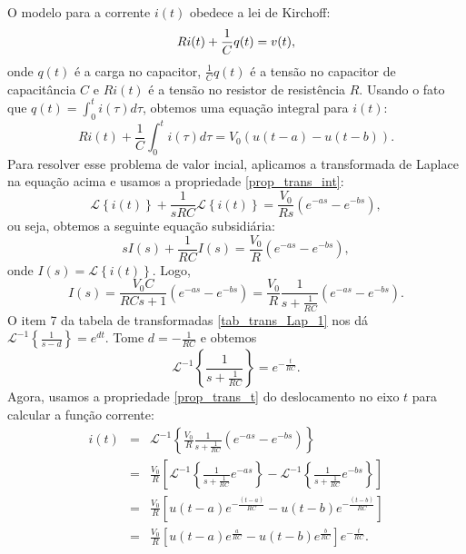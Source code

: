 O modelo para a corrente $i(t)$ obedece a lei de Kirchoff:
\begin{equation}{\label{modelo_corrente_0}}
 Ri(t)+\frac{1}{C}q(t)=v(t),
\end{equation}
onde $q(t)$ é a carga no capacitor, $\frac{1}{C}q(t)$ é a tensão no capacitor de capacitância $C$ e $Ri(t)$ é a tensão no resistor de resistência $R$. Usando o fato que $q(t)=\int_0^t i(\tau)d\tau$, obtemos uma equação integral para $i(t)$:
\begin{equation}
Ri(t)+\frac{1}{C}\int_0^t i(\tau)d\tau=V_0\left(u(t-a)-u(t-b)\right).
\end{equation}
Para resolver esse problema de valor incial, aplicamos a transformada de Laplace na equação acima e usamos a propriedade \ref{prop_trans_int}:
\begin{equation}
\mathcal{L}\left\{i(t)\right\}+\frac{1}{sRC}\mathcal{L}\left\{i(t)\right\}=\frac{V_0}{Rs}\left(e^{-as}-e^{-bs}\right),
\end{equation}
ou seja, obtemos a seguinte equação subsidiária:
\begin{equation}
sI(s)+\frac{1}{RC}I(s)=\frac{V_0}{R}\left(e^{-as}-e^{-bs}\right),
\end{equation}
onde $I(s)=\mathcal{L}\left\{i(t)\right\}$. Logo,
\begin{equation}
I(s)=\frac{V_0 C}{RCs+1}\left(e^{-as}-e^{-bs}\right)=\frac{V_0}{R}\frac{1}{s+\frac{1}{RC}}\left(e^{-as}-e^{-bs}\right).
\end{equation}
O item 7 da tabela de transformadas \ref{tab_trans_Lap_1} nos dá $\mathcal{L}^{-1}\left\{\frac{1}{s-d}\right\}=e^{dt}$. Tome $d=-\frac{1}{RC}$ e obtemos
\begin{equation}
\mathcal{L}^{-1}\left\{\frac{1}{s+\frac{1}{RC}}\right\}=e^{-\frac{t}{RC}}.
\end{equation}
Agora, usamos a propriedade \ref{prop_trans_t} do deslocamento no eixo $t$ para calcular a função corrente:
\begin{eqnarray*}
i(t)&=&\mathcal{L}^{-1}\left\{\frac{V_0}{R}\frac{1}{s+\frac{1}{RC}}\left(e^{-as}-e^{-bs}\right)\right\}\\
&=&\frac{V_0}{R}\left[\mathcal{L}^{-1}\left\{\frac{1}{s+\frac{1}{RC}}e^{-as}\right\}-\mathcal{L}^{-1}\left\{\frac{1}{s+\frac{1}{RC}}e^{-bs}\right\}\right]\\
&=&\frac{V_0}{R}\left[u(t-a)e^{-\frac{(t-a)}{RC}}-u(t-b)e^{-\frac{(t-b)}{RC}}\right]\\
&=&\frac{V_0}{R}\left[u(t-a)e^{\frac{a}{RC}}-u(t-b)e^{\frac{b}{RC}}\right]e^{-\frac{t}{RC}}.
\end{eqnarray*}
